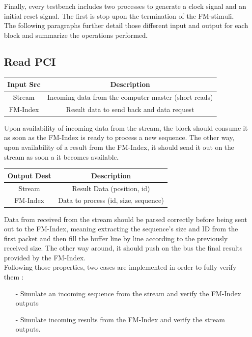 Finally, every testbench includes two processes to generate a clock signal and an initial reset signal. The first is stop upon the termination of the FM-stimuli. \\

The following paragraphs further detail those different input and output for each block and summarize the operations performed.


\subsection{Read PCI}
\vspace*{3mm}
\begin{center}
    \begin{tabular}{|c|c|}
\hline
  Input Src   &  Description \\
  \hline
   Stream  & Incoming data from the computer master (short reads) \\
   FM-Index & Result data to send back and data request \\
   \hline
\end{tabular}
\end{center}
\vspace*{5mm}

Upon availability of incoming data from the stream, the block should consume it as soon as the FM-Index is ready to process a new sequence. The other way, upon availability of a result from the FM-Index, it should send it out on the stream as soon a it becomes available.
\begin{center}
\begin{tabular}{|c|c|}
\hline
  Output Dest   &  Description \\
  \hline
   Stream  & Result Data (position, id) \\
   FM-Index & Data to process (id, size, sequence) \\
   \hline
\end{tabular}
\end{center}
\vspace*{5mm}
Data from received from the stream should be parsed correctly before being sent out to the FM-Index, meaning extracting the sequence's size and ID from the first packet and then fill the buffer line by line according to the previously received size. The other way around, it should push on the bus the final results provided by the FM-Index. \\


Following those properties, two cases are implemented in order to fully verify them :
\begin{itemize}
    \item [-] Simulate an incoming sequence from the stream and verify the FM-Index outputs
    \item [-] Simulate incoming results from the FM-Index and verify the stream outputs.
\end{itemize}


